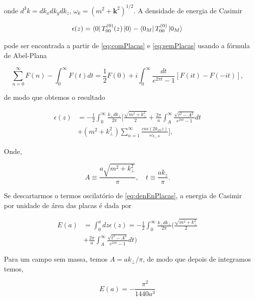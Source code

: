 onde $d^3k = dk_xdk_ydk_z$, $\omega_k = (m^2+\bm{k}^2)^{1/2}$. A densidade de energia de Casimir

\begin{equation}
\epsilon(z) = \bra{0} T_{00}^{(0)}(z) \ket{0} - \bra{0_M} T_{00}^{(0)} \ket{0_M}
\end{equation}

pode ser encontrada a partir de \eqref{eq:comPlacas} e \eqref{eq:semPlacas} usando a fórmula de Abel-Plana

\begin{equation}
\sum_{n=0}^\infty F(n) - \int_0^\infty F(t)dt = \frac{1}{2} F(0) + i \int_0^\infty \frac{dt}{e^{2\pi t} - 1} [F(it)  - F(-it)], \label{eq:abelPlana}
\end{equation}

de modo que obtemos o resultado

\begin{equation}
\begin{aligned}
\epsilon(z) &= -\frac{1}{2} \int_0^\infty  \frac{k_\perp dk_\perp}{2\pi} \bigg[ \frac{\sqrt{m^2 + k_\perp^2}}{2} + \frac{2\pi}{a} \int_A^\infty \frac{\sqrt{t^2 - A^2}}{e^{2\pi t} - 1}dt \\
 &+ (m^2 + k_\perp^2)\sum_{n=1}^\infty \frac{cos(2k_{zn}z)}{\omega_{k_\perp, n}} \bigg], \label{eq:denEnPlacas}
\end{aligned}
\end{equation}

Onde,

\begin{equation}
A \equiv \frac{a\sqrt{m^2 + k_\perp^2}}{\pi}, \quad t \equiv \frac{ak_z}{\pi}.
\end{equation}

Se descartarmos o termos oscilatório de \eqref{eq:denEnPlacas}, a energia de Casimir por unidade de área das placas é dada por

\begin{equation}
\begin{aligned}
E(a) &= \int_0^a dz \epsilon(z) = -\frac{1}{2} \int_0^\infty \frac{k_\perp dk_\perp}{2\pi} \bigg( \frac{\sqrt{m^2 + k_\perp^2}}{2} \\
&+ \frac{2\pi}{a} \int_A^\infty \frac{\sqrt{t^2 - A^2}}{e^{2\pi t}-1}dt \bigg)
\end{aligned}
\end{equation}

Para um campo sem massa, temos $A = ak_\perp / \pi$, de modo que depois de integramos temos, 

\begin{equation}
E(a) = -\frac{\pi^2}{1440a^3} \label{eq:EnergiaEntrePlacas} %
\end{equation}

